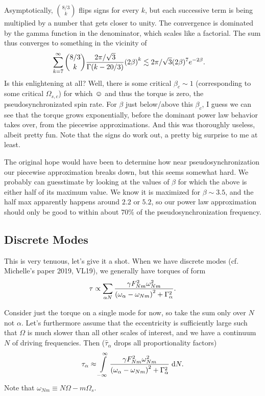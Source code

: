 \documentclass[11pt,
        usenames, %
        dvipsnames %
    ]{article}
\DeclarePairedDelimiter\p{\lparen}{\rparen}
\begin{document}
Asymptotically, $\binom{8/3}{k}$ flips signs for every $k$, but each successive
term is being multiplied by a number that gets closer to unity. The convergence
is dominated by the gamma function in the denominator, which scales like a
factorial. The sum thus converges to something in the vicinity of
\begin{align}
    \sum\limits_{k = 7}^\infty \binom{8/3}{k}
            \frac{2\pi/\sqrt{3}}{\Gamma\p*{k - 20/3}}\p*{2\beta}^k
        &\lesssim 2\pi/\sqrt{3}(2\beta)^7 e^{-2\beta}.
\end{align}
Is this enlightening at all? Well, there is some critical $\beta_c \sim 1$
(corresponding to some critical $\Omega_{s,c}$) for which $\smiley$ and thus the
torque is zero, the pseudosynchronizated spin rate. For $\beta$ just below/above
this $\beta_c$, I guess we can see that the torque grows exponentially, before
the dominant power law behavior takes over, from the piecewise approximations.
And this was thoroughly useless, albeit pretty fun. Note that the signs do work
out, a pretty big surprise to me at least.

The original hope would have been to determine how near pseudosynchronization
our piecewise approximation breaks down, but this seems somewhat hard. We
probably can guesstimate by looking at the values of $\beta$ for which the above
is either half of its maximum value. We know it is maximized for $\beta \sim
3.5$, and the half max apparently happens around $2.2$ or $5.2$, so our power
law approximation should only be good to within about $70\%$ of the
pseudosynchronization frequency.

\subsection{Discrete Modes}

This is very tenuous, let's give it a shot. When we have discrete modes (cf.
Michelle's paper 2019, VL19), we generally have torques of form
\begin{equation}
    \tau \propto \sum\limits_{\alpha N}
        \frac{\gamma F_{Nm}^2 \omega_{Nm}^2}{
            \p*{\omega_\alpha - \omega_{Nm}}^2 + \Gamma_\alpha^2}.
\end{equation}

Consider just the torque on a single mode for now, so take the sum only over $N$
not $\alpha$. Let's furthermore assume that the eccentricity is sufficiently
large such that $\Omega$ is much slower than all other scales of interest, and
we have a continuum $N$ of driving frequencies. Then ($\hat{\tau}_\alpha$ drops
all proportionality factors)
\begin{equation}
    \tau_\alpha \approx \int\limits_{-\infty}^\infty
        \frac{\gamma F_{Nm}^2 \omega_{Nm}^2}{
            \p*{\omega_\alpha - \omega_{Nm}}^2 + \Gamma_\alpha^2}\;\mathrm{d}N.
\end{equation}
Note that $\omega_{Nm} \equiv N\Omega - m\Omega_s$.
\end{document}
